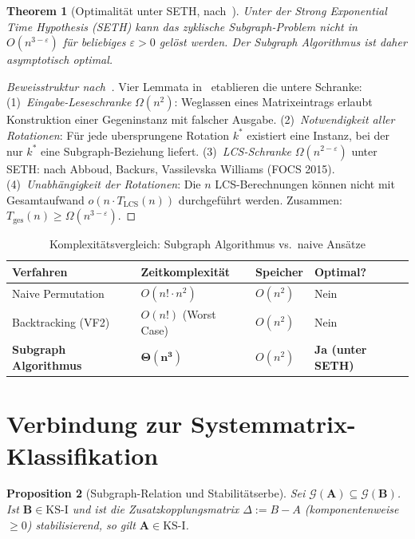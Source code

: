 ﻿\documentclass[12pt, a4paper, titlepage]{report}
\newtheorem{theorem}{Theorem}[section]
\newtheorem{proposition}[theorem]{Proposition}
\theoremstyle{definition}
\theoremstyle{remark}
\newcommand{\vA}{\bm{A}}
\newcommand{\vB}{\bm{B}}
\newcommand{\KS}{\mathrm{KS}}
\begin{document}
\begin{theorem}[Optimalität unter SETH, nach~\citep{epp2026subgraph}]
\label{thm:optimalitaet_subgraph}
Unter der Strong Exponential Time Hypothesis (SETH) kann das zyklische
Subgraph-Problem nicht in $O(n^{3-\varepsilon})$ für beliebiges $\varepsilon > 0$
gelöst werden. Der Subgraph Algorithmus ist daher asymptotisch \emph{optimal}.
\end{theorem}

\begin{proof}[Beweisstruktur nach~\citep{epp2026subgraph}]
Vier Lemmata in~\citep{epp2026subgraph} etablieren die untere Schranke:
(1)~\emph{Eingabe-Leseschranke} $\Omega(n^2)$: Weglassen eines Matrixeintrags
erlaubt Konstruktion einer Gegeninstanz mit falscher Ausgabe.
(2)~\emph{Notwendigkeit aller Rotationen}: Für jede ubersprungene Rotation $k^*$
existiert eine Instanz, bei der nur $k^*$ eine Subgraph-Beziehung liefert.
(3)~\emph{LCS-Schranke} $\Omega(n^{2-\varepsilon})$ unter SETH: nach Abboud,
Backurs, Vassilevska Williams (FOCS 2015).
(4)~\emph{Unabhängigkeit der Rotationen}: Die $n$ LCS-Berechnungen können nicht
mit Gesamtaufwand $o(n \cdot T_\mathrm{LCS}(n))$ durchgeführt werden.
Zusammen: $T_\mathrm{ges}(n) \geq \Omega(n^{3-\varepsilon})$.
\end{proof}

\begin{table}[H]
\centering
\caption{Komplexitätsvergleich: Subgraph Algorithmus vs.\ naive Ansätze}
\label{tab:komplex_subgraph}
\begin{tabular}{llll}
\toprule
Verfahren & Zeitkomplexität & Speicher & Optimal? \\
\midrule
Naive Permutation & $O(n! \cdot n^2)$ & $O(n^2)$ & Nein \\
Backtracking (VF2) & $O(n!)$ (Worst Case) & $O(n^2)$ & Nein \\
\textbf{Subgraph Algorithmus} & $\bm{\Theta(n^3)}$ & $O(n^2)$ & \textbf{Ja (unter SETH)} \\
\bottomrule
\end{tabular}
\end{table}

\section{Verbindung zur Systemmatrix-Klassifikation}

\begin{proposition}[Subgraph-Relation und Stabilitätserbe]
\label{prop:stabilitaetserbe}
Sei $\mathcal{G}(\vA) \subseteq \mathcal{G}(\vB)$. Ist $\vB \in \KS\text{-I}$ und
ist die Zusatzkopplungsmatrix $\Delta := B - A$ (komponentenweise $\geq 0$)
stabilisierend, so gilt $\vA \in \KS\text{-I}$.
\end{proposition}
\end{document}

